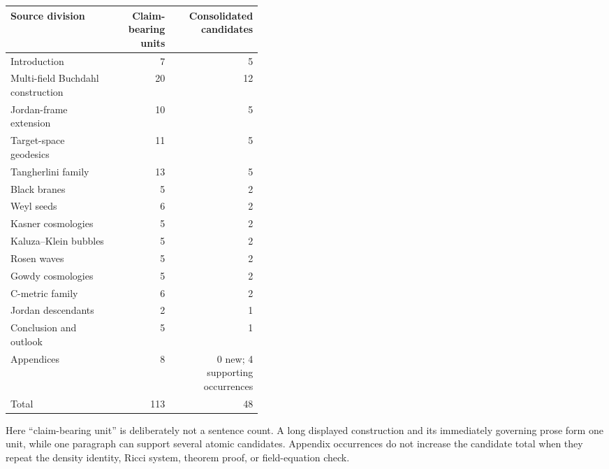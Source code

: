 \begin{center}
\begin{tabular}{p{0.42\linewidth}rr}
\hline
Source division & Claim-bearing units & Consolidated candidates \\
\hline
Introduction & 7 & 5 \\
Multi-field Buchdahl construction & 20 & 12 \\
Jordan-frame extension & 10 & 5 \\
Target-space geodesics & 11 & 5 \\
Tangherlini family & 13 & 5 \\
Black branes & 5 & 2 \\
Weyl seeds & 6 & 2 \\
Kasner cosmologies & 5 & 2 \\
Kaluza--Klein bubbles & 5 & 2 \\
Rosen waves & 5 & 2 \\
Gowdy cosmologies & 5 & 2 \\
C-metric family & 6 & 2 \\
Jordan descendants & 2 & 1 \\
Conclusion and outlook & 5 & 1 \\
Appendices & 8 & 0 new; 4 supporting occurrences \\
\hline
Total & 113 & 48 \\
\hline
\end{tabular}
\end{center}

Here ``claim-bearing unit'' is deliberately not a sentence count. A long displayed construction and its immediately governing prose form one unit, while one paragraph can support several atomic candidates. Appendix occurrences do not increase the candidate total when they repeat the density identity, Ricci system, theorem proof, or field-equation check.

